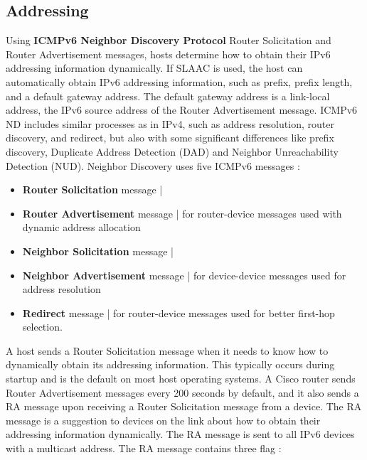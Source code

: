 \documentclass[11pt]{article}
\begin{document}
\subsection{Addressing}
Using \textbf{ICMPv6 Neighbor Discovery Protocol} Router Solicitation and Router Advertisement messages, hosts determine how to obtain their IPv6 addressing information dynamically. If SLAAC is used, the host can automatically obtain IPv6 addressing information, such as prefix, prefix length, and a default gateway address. The default gateway address is a link-local address, the IPv6 source address of the Router Advertisement message. ICMPv6 ND includes similar processes as in IPv4,  such as address resolution, router discovery, and redirect, but also with some significant differences like prefix discovery, Duplicate Address Detection (DAD) and Neighbor Unreachability Detection (NUD). Neighbor Discovery uses five ICMPv6 messages :
\begin{itemize}
\item \textbf{Router Solicitation} message  |
\item \textbf{Router Advertisement} message | for router-device messages used with dynamic address allocation
\item \textbf{Neighbor Solicitation} message  |
\item \textbf{Neighbor Advertisement} message | for device-device messages used for address resolution
\item \textbf{Redirect} message | for router-device messages used for better first-hop selection.  
\end{itemize}  
A host sends a Router Solicitation message when it needs to know how to dynamically obtain its addressing information. This typically occurs during startup and is the default on most host operating systems. A Cisco router sends Router Advertisement messages every 200 seconds by default, and it also sends a RA message upon receiving a Router Solicitation message from a device. The RA message is a suggestion to devices on the link about how to obtain their addressing information dynamically. The RA
message is sent to all IPv6 devices with a multicast address. The RA message contains three flag :
\end{document}
